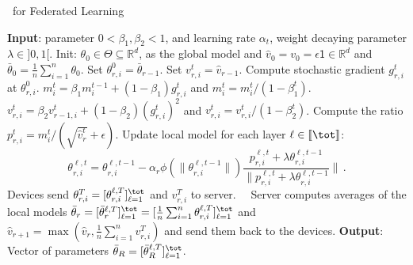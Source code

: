 \documentclass[twoside]{article}
\begin{document}
\begin{algorithm}[t]
\caption{\algo\ for Federated Learning} \label{alg:ldams}
\begin{algorithmic}[1]
\STATE \textbf{Input}: parameter $0< \beta_1, \beta_2 <1$, and learning rate $\alpha_t$, weight decaying parameter $\lambda \in ]0,1[$.
\STATE Init: $\theta_{0} \in \Theta \subseteq \mathbb R^d $, as the global model and $\hat v_0=v_{0} = \epsilon \mathsf{1} \in \mathbb R^{d}$ and $\bar{\theta}_0 =  \frac{1}{n} \sum_{i=1}^n \theta_0$.
\STATE Set $\theta_{r,i}^{0} = \bar{\theta}_{r-1}$.
\STATE Set $v^{t}_{r,i} = \hat{v}_{r-1}$.
\STATE Compute stochastic gradient $g^t_{r,i}$ at $\theta_{r,i}^{0}$.
\STATE $m^t_{i} = \beta_1 m^{t-1}_{i} + (1 - \beta_1) g^t_{r,i}$ and $m^{t}_{i}=m^{t}_{i} /\left(1-\beta_{1}^{t}\right)$. \label{line:new1}
\STATE $v^{t}_{r,i} = \beta_2 v^{t}_{r-1,i} + (1 - \beta_2) (g^t_{r,i})^2$ and $v^{t}_{r,i}=v^{t}_{r,i} /\left(1-\beta_{2}^{t}\right)$. \label{line:new2}
\STATE Compute the ratio  $p_{r,i}^t=m^{t}_{i}/(\sqrt{\hat v^{t}_{r}}+\epsilon)$. \label{line:scale}
\STATE Update local model for each layer $\ell \in \llbracket \tot \rrbracket$: \label{line:layer}
{\small
\begin{equation}\label{eq:upadtelayer}
    \theta_{r,i}^{\ell,t}=\theta_{r,i}^{\ell,t-1}-\alpha_{r} \phi(\|\theta_{r,i}^{\ell,t-1}\|)\frac{p_{r,i}^{\ell,t}+\lambda \theta_{r,i}^{\ell,t-1}}{ \|p_{r,i}^{\ell,t}+\lambda \theta_{r,i}^{\ell,t-1}}\|\, .
\end{equation}
}
\ENDFOR
\STATE Devices send $\theta_{r,i}^{T} = [\theta_{r,i}^{\ell,T}]_{\ell =1}^{\tot}$ and $v_{r,i}^T$ to server.
\ENDFOR
\STATE $\quad$Server computes averages of the local models $\bar{\theta}_r = [\bar{\theta}_r^{\ell,T}]_{\ell =1}^{\tot} = [\frac{1}{n} \sum_{i=1}^n \theta_{r,i}^{\ell,T}]_{\ell =1}^{\tot}$ and $\hat{v}_{r+1} = \max( \hat{v}_{r},\frac{1}{n} \sum_{i=1}^n v^T_{r,i} )$ and send them back to the devices. \label{line:final}
\ENDFOR
\STATE \textbf{Output}: Vector of parameters $\bar{\theta}_R = [\bar{\theta}_R^{\ell,T}]_{\ell =1}^{\tot}$.
\end{algorithmic}
\end{algorithm}
\end{document}

